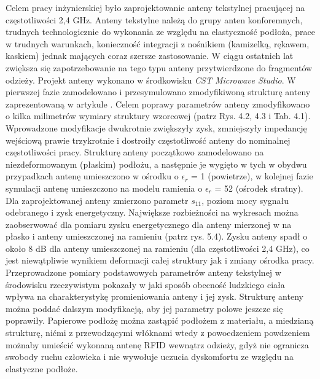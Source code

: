 Celem pracy inżynierskiej było zaprojektowanie anteny tekstylnej pracującej na częstotliwości 2,4 GHz. Anteny tekstylne należą do grupy anten konforemnych, trudnych technologicznie do wykonania ze względu na elastyczność podłoża, prace w trudnych warunkach, konieczność integracji z nośnikiem (kamizelką, rękawem, kaskiem) jednak mających coraz szersze zastosowanie. W ciągu ostatnich lat zwiększa się zapotrzebowanie na tego typu anteny przytwierdzone do fragmentów odzieży.
Projekt anteny wykonano w środkowisku \emph{CST Microwave Studio}. W pierwszej fazie zamodelowano i przesymulowano zmodyfikiwoną strukturę anteny zaprezentowaną w artykule \cite{Artykul_1}. Celem poprawy parametrów anteny zmodyfikowano o kilka milimetrów wymiary struktury wzorcowej (patrz Rys. 4.2, 4.3 i Tab. 4.1). Wprowadzone modyfikacje dwukrotnie zwiększyły zysk, zmniejszyły impedancję wejściową prawie trzykrotnie i dostroiły częstotliwość anteny do nominalnej częstotliwości pracy.
Strukturę anteny początkowo zamodelowano na niezdeformowanym (płaskim) podłożu, a następnie je wygięto w tych w obydwu przypadkach antenę umieszczono w ośrodku o $\epsilon_{r}$ = 1 (powietrze), w kolejnej fazie symulacji antenę umieszczono na modelu ramienia o $\epsilon_{r}$ = 52 (ośrodek stratny).    
Dla zaprojektowanej anteny zmierzono parametr $s_{11}$, poziom mocy sygnału odebranego i zysk energetyczny. Największe rozbieżności na wykresach można zaobserwować dla pomiaru zysku energetycznego dla anteny mierzonej w na płasko i anteny umieszczonej na ramieniu (patrz rys. 5.4). Zysku anteny spadł o około 8 dB dla anteny umieszczonej na ramieniu (dla częstotliwości 2,4 GHz), co jest niewątpliwie wynikiem deformacji całej struktury jak i zmiany ośrodka pracy. 
Przeprowadzone pomiary podstawowych parametrów anteny tekstylnej w środowisku rzeczywistym pokazały w jaki sposób obecność ludzkiego ciała wpływa na charakterystykę promieniowania anteny i jej zysk.
Strukturę anteny można poddać dalszym modyfikacją, aby jej parametry polowe jeszcze się poprawiły. Papierowe podłożę można zastąpić podłożem z materiału, a miedzianą strukturę, nićmi z przewodzącymi włóknami wtedy z powoedzeniem powdzeniem możnaby umieścić wykonaną antenę RFID wewnątrz odzieży, gdyż nie ogranicza swobody ruchu człowieka i nie wywołuje uczucia dyskomfortu ze względu na elastyczne podłoże.

